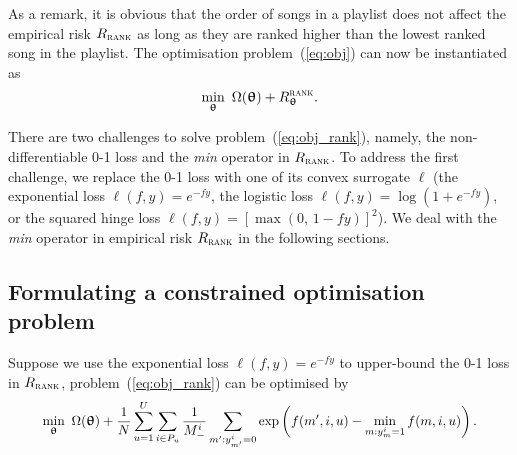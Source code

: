 As a remark, it is obvious that the order of songs in a playlist does not affect the empirical 
risk $R_\textsc{rank}$ as long as they are ranked higher than the lowest ranked song in the playlist.
The optimisation problem~(\ref{eq:obj}) can now be instantiated as 
\begin{equation}
\label{eq:obj_rank}
\min_{\bm{\uptheta}} \ \Omega({\bm{\uptheta}}) + R_{{\bm{\uptheta}}}^{\textsc{rank}}.
\end{equation}

There are two challenges to %
solve problem~(\ref{eq:obj_rank}),
namely, the non-differentiable 0-1 loss and the \emph{min} operator in $R_\textsc{rank}$.
To address the first challenge, we replace the 0-1 loss with one of its convex surrogate $\ell$
(\eg the exponential loss $\ell(f, y) = e^{-fy}$, the logistic loss $\ell(f, y) = \log(1 + e^{-fy})$,
or the squared hinge loss $\ell(f, y) = [\max(0, \, 1 - fy)]^2$).
We deal with the \emph{min} operator in empirical risk $R_\textsc{rank}$ in the following sections.




\subsection{Formulating a constrained optimisation problem}

Suppose we use the exponential loss $\ell(f, y) = e^{-fy}$ to upper-bound the 0-1 loss in $R_\textsc{rank}$,
problem~(\ref{eq:obj_rank}) can be optimised by
\begin{equation}
\label{eq:expobj_rank}
\resizebox{.9\linewidth}{!}{$\displaystyle
\min_{\upthetabm} \ \Omega(\upthetabm) + \frac{1}{N} \sum_{u=1}^U \sum_{i \in P_u} \frac{1}{M_-^i} 
                  \sum_{m': y_{m'}^i = 0} \exp \left(f(m', i, u) - \min_{m: y_m^i = 1} f(m, i, u) \right).
$}
\end{equation}

